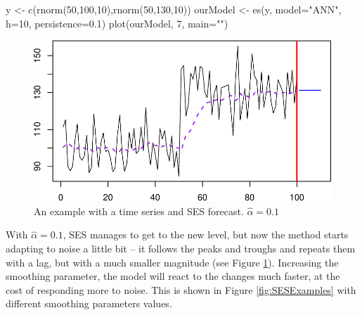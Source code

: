 \documentclass[
]{book}
\newenvironment{Shaded}{\begin{snugshade}}{\end{snugshade}}
\newcommand{\AttributeTok}[1]{\textcolor[rgb]{0.77,0.63,0.00}{#1}}
\newcommand{\DecValTok}[1]{\textcolor[rgb]{0.00,0.00,0.81}{#1}}
\newcommand{\FloatTok}[1]{\textcolor[rgb]{0.00,0.00,0.81}{#1}}
\newcommand{\FunctionTok}[1]{\textcolor[rgb]{0.00,0.00,0.00}{#1}}
\newcommand{\NormalTok}[1]{#1}
\newcommand{\OtherTok}[1]{\textcolor[rgb]{0.56,0.35,0.01}{#1}}
\newcommand{\StringTok}[1]{\textcolor[rgb]{0.31,0.60,0.02}{#1}}
\theoremstyle{definition}
\theoremstyle{definition}
\theoremstyle{definition}
\theoremstyle{definition}
\theoremstyle{remark}
\begin{document}
\begin{Shaded}
\begin{Highlighting}[]
\NormalTok{y }\OtherTok{\textless{}{-}} \FunctionTok{c}\NormalTok{(}\FunctionTok{rnorm}\NormalTok{(}\DecValTok{50}\NormalTok{,}\DecValTok{100}\NormalTok{,}\DecValTok{10}\NormalTok{),}\FunctionTok{rnorm}\NormalTok{(}\DecValTok{50}\NormalTok{,}\DecValTok{130}\NormalTok{,}\DecValTok{10}\NormalTok{))}
\NormalTok{ourModel }\OtherTok{\textless{}{-}} \FunctionTok{es}\NormalTok{(y, }\AttributeTok{model=}\StringTok{"ANN"}\NormalTok{, }\AttributeTok{h=}\DecValTok{10}\NormalTok{, }\AttributeTok{persistence=}\FloatTok{0.1}\NormalTok{)}
\FunctionTok{plot}\NormalTok{(ourModel, }\DecValTok{7}\NormalTok{, }\AttributeTok{main=}\StringTok{""}\NormalTok{)}
\end{Highlighting}
\end{Shaded}

\begin{figure}
\centering
\includegraphics{Svetunkov--2022----ADAM_files/figure-latex/SESExample2-1.pdf}
\caption{\label{fig:SESExample2}An example with a time series and SES forecast. \(\hat{\alpha}=0.1\)}
\end{figure}

With \(\hat{\alpha}=0.1\), SES manages to get to the new level, but now the method starts adapting to noise a little bit -- it follows the peaks and troughs and repeats them with a lag, but with a much smaller magnitude (see Figure \ref{fig:SESExample2}). Increasing the smoothing parameter, the model will react to the changes much faster, at the cost of responding more to noise. This is shown in Figure \ref{fig:SESExamples} with different smoothing parameters values.
\end{document}
